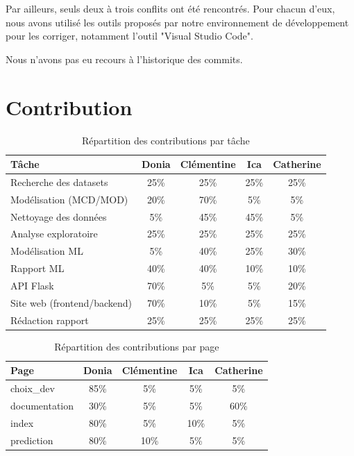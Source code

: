 \documentclass[mstat,12pt]{unswthesis}
\begin{document}
Par ailleurs, seuls deux à trois conflits ont été rencontrés. Pour chacun d’eux, nous avons utilisé les outils
proposés par notre environnement de développement pour les corriger, notamment l'outil "Visual Studio Code".

Nous n’avons pas eu recours à l’historique des commits.

\hypertarget{contributionParEtudiant}{%
\section{Contribution}\label{contributionParEtudiant}}

\begin{table}[H]
\centering
\begin{tabular}{|l|c|c|c|c|}
\hline
\textbf{Tâche} & \textbf{Donia} & \textbf{Clémentine} & \textbf{Ica} & \textbf{Catherine} \\
\hline
Recherche des datasets & 25\% & 25\% & 25\% & 25\% \\
\hline
Modélisation (MCD/MOD) & 20\% & 70\% & 5\% & 5\% \\
\hline
Nettoyage des données & 5\% & 45\% & 45\% & 5\% \\
\hline
Analyse exploratoire & 25\% & 25\% & 25\% & 25\% \\
\hline
Modélisation ML & 5\% & 40\% & 25\% & 30\% \\
\hline
Rapport ML & 40\% & 40\% & 10\% & 10\% \\
\hline
API Flask & 70\% & 5\% & 5\% & 20\% \\
\hline
Site web (frontend/backend) & 70\% & 10\% & 5\% & 15\% \\
\hline
Rédaction rapport & 25\% & 25\% & 25\% & 25\% \\
\hline
\end{tabular}
\caption{Répartition des contributions par tâche}
\end{table}


\begin{table}[H]
\centering
\begin{tabular}{|l|c|c|c|c|}
\hline
\textbf{Page} & \textbf{Donia} & \textbf{Clémentine} & \textbf{Ica} & \textbf{Catherine} \\
\hline
choix\_dev & 85\% & 5\% & 5\% & 5\% \\
\hline
documentation & 30\% & 5\% & 5\% & 60\% \\
\hline
index & 80\% & 5\% & 10\% & 5\% \\
\hline
prediction & 80\% & 10\% & 5\% & 5\% \\
\hline
\end{tabular}
\caption{Répartition des contributions par page}
\end{table}
\end{document}
